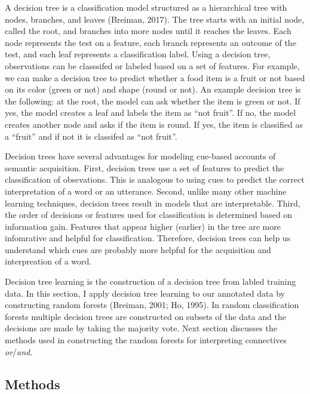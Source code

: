 \documentclass[oneside]{report}
\theoremstyle{definition}
\theoremstyle{definition}
\theoremstyle{definition}
\theoremstyle{remark}
\begin{document}
A decision tree is a classification model structured as a hierarchical
tree with nodes, branches, and leaves (Breiman, 2017). The tree starts
with an initial node, called the root, and branches into more nodes
until it reaches the leaves. Each node represents the test on a feature,
each branch represents an outcome of the test, and each leaf represents
a classification label. Using a decision tree, observations can be
classsifed or labeled based on a set of features. For example, we can
make a decision tree to predict whether a food item is a fruit or not
based on its color (green or not) and shape (round or not). An example
decision tree is the following: at the root, the model can ask whether
the item is green or not. If yes, the model creates a leaf and labels
the item as ``not fruit''. If no, the model creates another node and
asks if the item is round. If yes, the item is classified as a ``fruit''
and if not it is classifed as ``not fruit''.

Decision trees have several advantages for modeling cue-based accounts
of semantic acquisition. First, decision trees use a set of features to
predict the classification of obsevations. This is analogous to using
cues to predict the correct interpretation of a word or an utterance.
Second, unlike many other machine learning techniques, decision trees
result in models that are interpretable. Third, the order of decisions
or features used for classification is determined based on information
gain. Features that appear higher (earlier) in the tree are more
infomrative and helpful for classification. Therefore, decision trees
can help us understand which cues are probably more helpful for the
acquisition and interpreation of a word.

Decision tree learning is the construction of a decision tree from
labled training data. In this section, I apply decision tree learning to
our annotated data by constructing random forests (Breiman, 2001; Ho,
1995). In random classification forests multiple decision trees are
constructed on subsets of the data and the decisions are made by taking
the majority vote. Next section discusses the methods used in
constructing the random forests for interpreting connectives
\emph{or}/\emph{and}.

\subsection{Methods}\label{methods-1}
\end{document}
